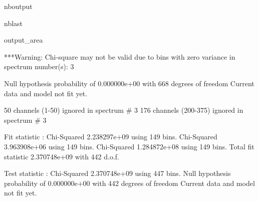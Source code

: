 \documentclass[letterpaper,10pt,english]{sphinxmanual}
\begin{document}
\begin{sphinxuseclass}{nboutput}
\begin{sphinxuseclass}{nblast}
{\begin{sphinxuseclass}{output_area}
\begin{sphinxuseclass}{}
\begin{sphinxVerbatim}[commandchars=\\\{\}]
***Warning: Chi-square may not be valid due to bins with zero variance
            in spectrum number(s): 3

 Null hypothesis probability of 0.000000e+00 with 668 degrees of freedom
 Current data and model not fit yet.

    50 channels (1-50) ignored in spectrum \#     3
   176 channels (200-375) ignored in spectrum \#     3

Fit statistic  : Chi-Squared              2.238297e+09     using 149 bins.
                 Chi-Squared              3.963908e+06     using 149 bins.
                 Chi-Squared              1.284872e+08     using 149 bins.
Total fit statistic                       2.370748e+09     with 442 d.o.f.

Test statistic : Chi-Squared              2.370748e+09     using 447 bins.
 Null hypothesis probability of 0.000000e+00 with 442 degrees of freedom
 Current data and model not fit yet.

\end{sphinxVerbatim}



\end{sphinxuseclass}
\end{sphinxuseclass}
}

\end{sphinxuseclass}
\end{sphinxuseclass}
\end{document}
